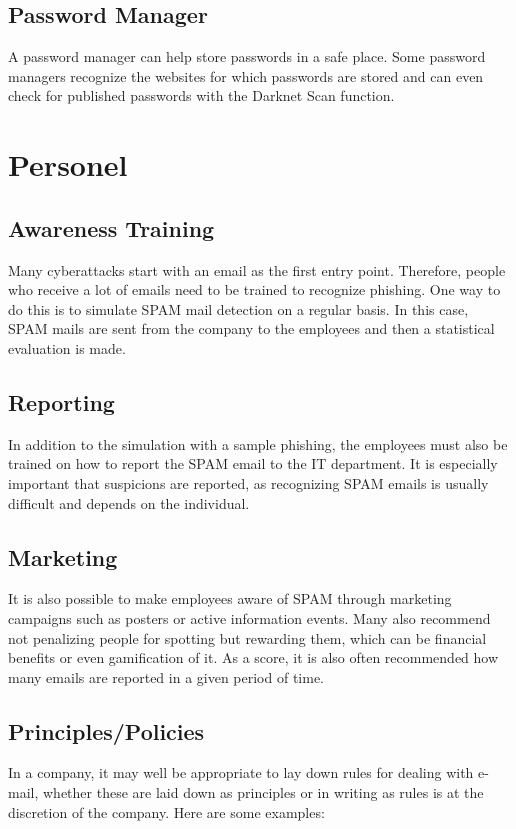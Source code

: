 \subsection{Password Manager}
A password manager can help store passwords in a safe place. Some password managers recognize the websites for which passwords are stored and can even check for published passwords with the Darknet Scan function.

\section{Personel}

\subsection{Awareness Training}
Many cyberattacks start with an email as the first entry point.
Therefore, people who receive a lot of emails need to be trained to recognize phishing.
One way to do this is to simulate SPAM mail detection on a regular basis.
In this case, SPAM mails are sent from the company to the employees and then a statistical evaluation is made.

\subsection{Reporting}
In addition to the simulation with a sample phishing, the employees must also be trained on how to report the SPAM email to the IT department.
It is especially important that suspicions are reported, as recognizing SPAM emails is usually difficult and depends on the individual.

\subsection{Marketing}
It is also possible to make employees aware of SPAM through marketing campaigns such as posters or active information events.
Many also recommend not penalizing people for spotting but rewarding them, which can be financial benefits or even gamification of it.
As a score, it is also often recommended how many emails are reported in a given period of time.

\subsection{Principles/Policies}
In a company, it may well be appropriate to lay down rules for dealing with e-mail, whether these are laid down as principles or in writing as rules is at the discretion of the company.
Here are some examples:

